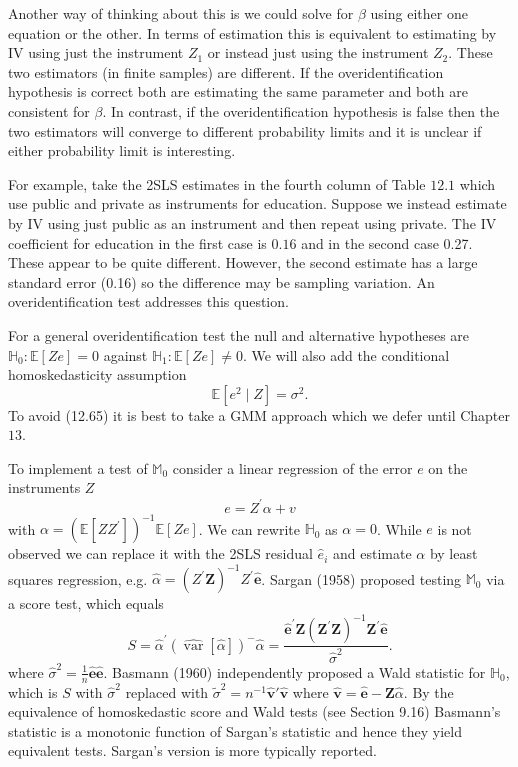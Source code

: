 \documentclass[10pt]{article}
\begin{document}
Another way of thinking about this is we could solve for $\beta$ using either one equation or the other. In terms of estimation this is equivalent to estimating by IV using just the instrument $Z_{1}$ or instead just using the instrument $Z_{2}$. These two estimators (in finite samples) are different. If the overidentification hypothesis is correct both are estimating the same parameter and both are consistent for $\beta$. In contrast, if the overidentification hypothesis is false then the two estimators will converge to different probability limits and it is unclear if either probability limit is interesting.

For example, take the 2SLS estimates in the fourth column of Table $12.1$ which use public and private as instruments for education. Suppose we instead estimate by IV using just public as an instrument and then repeat using private. The IV coefficient for education in the first case is $0.16$ and in the second case 0.27. These appear to be quite different. However, the second estimate has a large standard error (0.16) so the difference may be sampling variation. An overidentification test addresses this question.

For a general overidentification test the null and alternative hypotheses are $\mathbb{H}_{0}: \mathbb{E}[Z e]=0$ against $\mathbb{H}_{1}: \mathbb{E}[Z e] \neq 0$. We will also add the conditional homoskedasticity assumption
$$
\mathbb{E}\left[e^{2} \mid Z\right]=\sigma^{2} .
$$
To avoid (12.65) it is best to take a GMM approach which we defer until Chapter $13 .$

To implement a test of $\mathbb{M}_{0}$ consider a linear regression of the error $e$ on the instruments $Z$
$$
e=Z^{\prime} \alpha+v
$$
with $\alpha=\left(\mathbb{E}\left[Z Z^{\prime}\right]\right)^{-1} \mathbb{E}[Z e]$. We can rewrite $\mathbb{H}_{0}$ as $\alpha=0$. While $e$ is not observed we can replace it with the 2SLS residual $\widehat{e}_{i}$ and estimate $\alpha$ by least squares regression, e.g. $\widehat{\alpha}=\left(Z^{\prime} \boldsymbol{Z}\right)^{-1} Z^{\prime} \widehat{\boldsymbol{e}}$. Sargan (1958) proposed testing $\mathbb{M}_{0}$ via a score test, which equals
$$
S=\widehat{\alpha}^{\prime}(\widehat{\operatorname{var}}[\widehat{\alpha}])^{-} \widehat{\alpha}=\frac{\widehat{\boldsymbol{e}}^{\prime} \boldsymbol{Z}\left(\boldsymbol{Z}^{\prime} \boldsymbol{Z}\right)^{-1} \boldsymbol{Z}^{\prime} \widehat{\boldsymbol{e}}}{\widehat{\sigma}^{2}} .
$$
where $\widehat{\sigma}^{2}=\frac{1}{n} \widehat{\boldsymbol{e}} \widehat{\boldsymbol{e}}$. Basmann (1960) independently proposed a Wald statistic for $\mathbb{H}_{0}$, which is $S$ with $\widehat{\sigma}^{2}$ replaced with $\widetilde{\sigma}^{2}=n^{-1} \widehat{\boldsymbol{v}} ' \widehat{\boldsymbol{v}}$ where $\widehat{\boldsymbol{v}}=\widehat{\boldsymbol{e}}-\boldsymbol{Z} \widehat{\alpha}$. By the equivalence of homoskedastic score and Wald tests (see Section 9.16) Basmann's statistic is a monotonic function of Sargan's statistic and hence they yield equivalent tests. Sargan's version is more typically reported.
\end{document}

